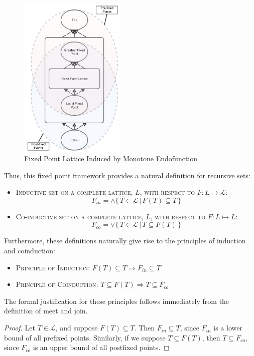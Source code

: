 \begin{figure}
\centering
\includegraphics[width=50mm,scale=0.5]{lattice}
\caption{Fixed Point Lattice Induced by Monotone Endofunction}
\label{fig-lattice}
\end{figure}


Thus, this fixed point framework provides a natural definition for recursive sets:
\begin{itemize}
\item[] \textsc{Inductive set on a complete lattice, $L$, with respect to $F:L \mapsto\mathcal{L}$}: 
$$F_{in} = \wedge \{\, T \in\mathcal{L}\,|\, F(T) \subseteq T \,\}$$
\item[] \textsc{Co-inductive set on a complete lattice, $L$, with respect to $F:L \mapsto L$}: 
$$F_{co} = \vee \{\, T \in\mathcal{L}\,|\, T \subseteq F(T) \,\}$$
\end{itemize}

Furthermore, these definitions naturally give rise to the principles of induction and coinduction:
\begin{itemize}
\item[] \textsc{Principle of Induction}: $F(T) \subseteq T \Rightarrow F_{in} \subseteq T$
\item[] \textsc{Principle of Coinduction}: $T \subseteq F(T) \Rightarrow T \subseteq F_{co}$
\end{itemize}

The formal justification for these principles follows immediately from the definition of meet and join.
\begin{proof}
Let $T \in \mathcal{L}$, and suppose $F(T) \subseteq T$. Then $F_{in} \subseteq T$, since $F_{in}$ is a lower bound of all prefixed points.
Similarly, if we suppose $T \subseteq F(T)$, then $T \subseteq F_{co}$, since $F_{co}$ is an upper bound of all postfixed points.
\end{proof}

